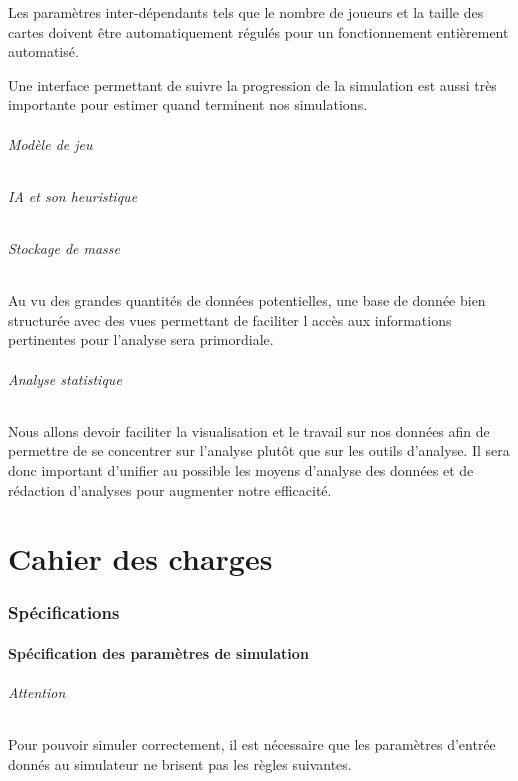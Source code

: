 \documentclass[
	headsepline=on,
	footsepline=on,
	twoside=off,
	abstract=on,
	DIV=10
]{scrreprt}
\begin{document}
		Les paramètres inter-dépendants tels que le nombre de joueurs et la taille des cartes doivent être automatiquement régulés pour un fonctionnement entièrement automatisé.
		
		Une interface permettant de suivre la progression de la simulation est aussi très importante pour estimer quand terminent nos simulations.
		
		\paragraph{Modèle de jeu}	
		\paragraph{IA et son heuristique}
		\paragraph{Stockage de masse}
		Au vu des grandes quantités de données potentielles, une base de donnée bien structurée avec des vues permettant de faciliter l accès aux informations pertinentes pour l'analyse sera primordiale.
		
		\paragraph{Analyse statistique}
		Nous allons devoir faciliter la visualisation et le travail sur nos données afin de permettre de se concentrer sur l'analyse plutôt que sur les outils d'analyse. Il sera donc important d'unifier au possible les moyens d'analyse des données et de rédaction d'analyses pour augmenter notre efficacité.
		
		
		\part{Cahier des charges}
		

		
		
		\section{Spécifications}
			\subsection{Spécification des paramètres de simulation}
				\paragraph{Attention} Pour pouvoir simuler correctement, il est nécessaire que les paramètres d'entrée donnés au simulateur ne brisent pas les règles suivantes.
				
\end{document}
